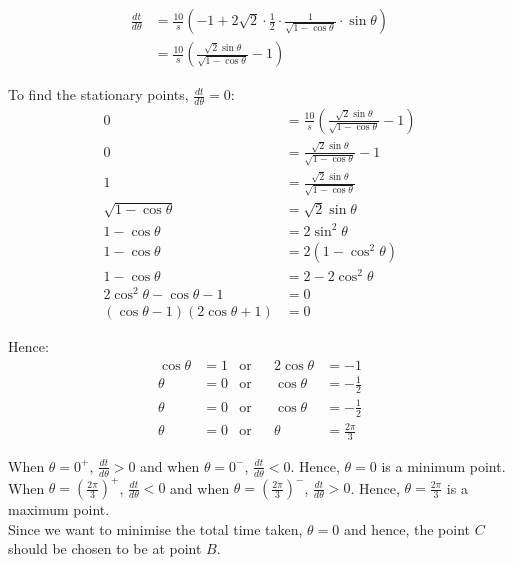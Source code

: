 \documentclass[11pt]{article}
\begin{document}
\begin{align*}
\frac{dt}{d \theta} &= \frac{10}{s} \left(-1 + 2\sqrt{2} \cdot \frac{1}{2} \cdot \frac{1}{\sqrt{1 - \cos \theta}} \cdot \sin \theta \right) \\
&= \frac{10}{s} \left( \frac{\sqrt{2} \sin \theta}{\sqrt{1 - \cos \theta}} - 1 \right)
\end{align*}

To find the stationary points, \(\frac{dt}{d \theta} = 0\):
\begin{align*}
0 &= \frac{10}{s} \left( \frac{\sqrt{2} \sin \theta}{\sqrt{1 - \cos \theta}} - 1\right) \\
0 &= \frac{\sqrt{2} \sin \theta}{\sqrt{1 - \cos \theta}} - 1 \\
1 &= \frac{\sqrt{2} \sin \theta}{\sqrt{1 - \cos \theta}} \\
\sqrt{1 - \cos \theta} &= \sqrt{2} \sin \theta \\
1 - \cos \theta &= 2 \sin^2 \theta \\
1 - \cos \theta &= 2 (1 - \cos^2 \theta) \\
1 - \cos \theta &= 2 - 2\cos^2 \theta \\
2 \cos^2 \theta - \cos \theta - 1 &= 0 \\
(\cos \theta - 1) (2\cos \theta + 1) &= 0
\end{align*}

Hence:
\begin{align*}
\cos \theta &= 1  &\text{or}& &2 \cos \theta &= -1 \\
\theta &= 0  &\text{or}& &\cos \theta &= -\frac{1}{2} \\
\theta &= 0  &\text{or}& &\cos \theta &= -\frac{1}{2} \\
\theta &= 0  &\text{or}& &\theta &= \frac{2\pi}{3}
\end{align*}

When \(\theta = 0^+\), \(\frac{dt}{d \theta} > 0\) and when \(\theta = 0^-\), \(\frac{dt}{d \theta} < 0\). Hence, \(\theta = 0\) is a minimum point.
\\[0pt]

When \(\theta = \left(\frac{2\pi}{3} \right)^+\), \(\frac{dt}{d \theta} < 0\) and when \(\theta = \left(\frac{2\pi}{3} \right)^-\), \(\frac{dt}{d \theta} > 0\). Hence, \(\theta = \frac{2\pi}{3}\) is a maximum point.
\\[0pt]

Since we want to minimise the total time taken, \(\theta = 0\) and hence, the point \(C\) should be chosen to be at point \(B\).
\end{document}
